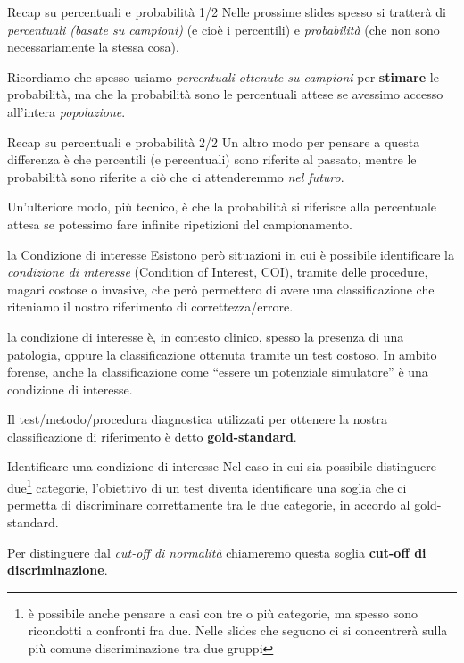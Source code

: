 \documentclass[
  ignorenonframetext,
]{beamer}
\begin{document}
\begin{frame}{Recap su percentuali e probabilità 1/2}
\label{recap-su-percentuali-e-probabilituxe0-12}
Nelle prossime slides spesso si tratterà di \emph{percentuali (basate su
campioni)} (e cioè i percentili) e \emph{probabilità} (che non sono
necessariamente la stessa cosa).

Ricordiamo che spesso usiamo \emph{percentuali ottenute su campioni} per
\textbf{stimare} le probabilità, ma che la probabilità sono le
percentuali attese se avessimo accesso all'intera \emph{popolazione}.
\end{frame}

\begin{frame}{Recap su percentuali e probabilità 2/2}
\label{recap-su-percentuali-e-probabilituxe0-22}
Un altro modo per pensare a questa differenza è che percentili (e
percentuali) sono riferite al passato, mentre le probabilità sono
riferite a ciò che ci attenderemmo \emph{nel futuro}.

Un'ulteriore modo, più tecnico, è che la probabilità si riferisce alla
percentuale attesa se potessimo fare infinite ripetizioni del
campionamento.
\end{frame}

\begin{frame}{la Condizione di interesse}
\label{la-condizione-di-interesse}
Esistono però situazioni in cui è possibile identificare la
\emph{condizione di interesse} (Condition of Interest, COI), tramite
delle procedure, magari costose o invasive, che però permettero di avere
una classificazione che riteniamo il nostro riferimento di
correttezza/errore.

la condizione di interesse è, in contesto clinico, spesso la presenza di
una patologia, oppure la classificazione ottenuta tramite un test
costoso. In ambito forense, anche la classificazione come ``essere un
potenziale simulatore'' è una condizione di interesse.

Il test/metodo/procedura diagnostica utilizzati per ottenere la nostra
classificazione di riferimento è detto \textbf{gold-standard}.
\end{frame}

\begin{frame}{Identificare una condizione di interesse}
\label{identificare-una-condizione-di-interesse}
Nel caso in cui sia possibile distinguere
due\footnote{è possibile anche pensare a casi con tre o più categorie, ma spesso sono ricondotti a confronti fra due. Nelle slides che seguono ci si concentrerà sulla più comune discriminazione tra due gruppi}
categorie, l'obiettivo di un test diventa identificare una soglia che ci
permetta di discriminare correttamente tra le due categorie, in accordo
al gold-standard.

Per distinguere dal \emph{cut-off di normalità} chiameremo questa soglia
\textbf{cut-off di discriminazione}.
\end{frame}
\end{document}
